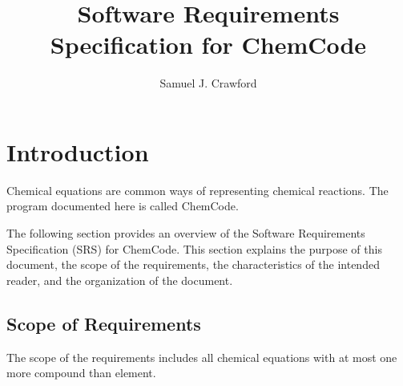 \documentclass[12pt]{article}
\title{Software Requirements Specification for ChemCode}
\author{Samuel J. Crawford}
\begin{document}
\maketitle
\tableofcontents
\newpage
\section{Introduction}
\label{Sec:Intro}
Chemical equations are common ways of representing chemical reactions. The program documented here is called ChemCode.

The following section provides an overview of the Software Requirements Specification (SRS) for ChemCode. This section explains the purpose of this document, the scope of the requirements, the characteristics of the intended reader, and the organization of the document.

\subsection{Scope of Requirements}
\label{Sec:ReqsScope}
The scope of the requirements includes all chemical equations with at most one more compound than element.
\end{document}
